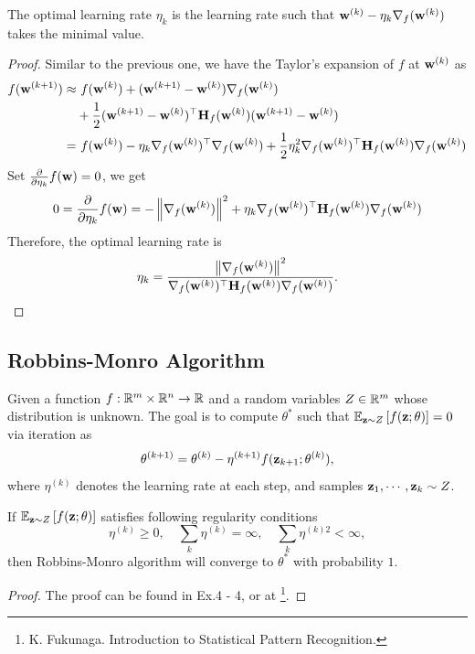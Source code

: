 \begin{property}
	The optimal learning rate $\eta_k$ is the learning rate such that $\mathbf{w}^{(k)} - \eta_k \nabla_f(\mathbf{w}^{(k)})$ takes the minimal value.
\end{property}
\begin{proof}
	Similar to the previous one, we have the Taylor's expansion of $f$ at $\mathbf{w}^{(k)}$ as
	\begin{align}
		f(\mathbf{w}^{(k+1)}) \approx & \ f(\mathbf{w}^{(k)}) + (\mathbf{w}^{(k+1)} - \mathbf{w}^{(k)}) \nabla_f(\mathbf{w}^{(k)}) \\ & + \frac{1}{2} (\mathbf{w}^{(k+1)} - \mathbf{w}^{(k)})^\top \mathbf{H}_f(\mathbf{w}^{(k)}) (\mathbf{w}^{(k+1)} - \mathbf{w}^{(k)}) \\
		= &  \ f(\mathbf{w}^{(k)}) - \eta_k \nabla_f(\mathbf{w}^{(k)})^\top \nabla_f(\mathbf{w}^{(k)}) + \frac{1}{2} \eta_k^2 \nabla_f(\mathbf{w}^{(k)})^\top \mathbf{H}_f(\mathbf{w}^{(k)}) \nabla_f(\mathbf{w}^{(k)})
	\end{align}
	Set $ \frac{\partial}{\partial \eta_k}f(\mathbf{w}) = 0$, we get
	\begin{equation}
		0 = \frac{\partial}{\partial \eta_k}f(\mathbf{w}) = - \left\lVert  \nabla_f(\mathbf{w}^{(k)})  \right\rVert^2 + \eta_k \nabla_f(\mathbf{w}^{(k)})^\top \mathbf{H}_f(\mathbf{w}^{(k)}) \nabla_f(\mathbf{w}^{(k)})
	\end{equation}
	Therefore, the optimal learning rate is
	\begin{equation}
		\eta_k = \frac{\left\lVert  \nabla_f(\mathbf{w}^{(k)})  \right\rVert^2}{\nabla_f(\mathbf{w}^{(k)})^\top \mathbf{H}_f(\mathbf{w}^{(k)}) \nabla_f(\mathbf{w}^{(k)})}.
	\end{equation}
\end{proof}

\subsection{Robbins-Monro Algorithm}
\begin{definition}
	Given a function $f: \mathbb{R}^m \times \mathbb{R}^n \rightarrow \mathbb{R}$ and a random variables $Z \in \mathbb{R}^m$ whose distribution is unknown. The goal is to compute $\theta^*$ such that $\mathbb{E}_{\mathbf{z}\sim Z}\left[ f(\mathbf{z}; \theta) \right] = 0$ via iteration as
\begin{equation}
	\theta^{(k + 1)} = \theta^{(k)} - \eta^{(k + 1)}f(\mathbf{z}_{k + 1}; \theta^{(k)}),
\end{equation}
where $\eta^{(k)}$ denotes the learning rate at each step, and samples $ \mathbf{z}_1, \cdots, \mathbf{z}_k \sim Z$.
\end{definition}
\begin{theorem}[Convergence]
If $\mathbb{E}_{\mathbf{z} \sim Z}\left[ f(\mathbf{z}; \theta) \right] $ satisfies following regularity conditions
$$
\eta^{(k)} \geq 0, \quad \sum_k \eta^{(k)} = \infty, \quad \sum_k \eta^{(k) 2} < \infty,
$$
then Robbins-Monro algorithm will converge to $\theta^*$ with probability $1$.
\end{theorem}
\begin{proof}
	The proof can be found in Ex.4 - 4, or at \footnote{K. Fukunaga. Introduction to Statistical Pattern Recognition.}.
\end{proof}

